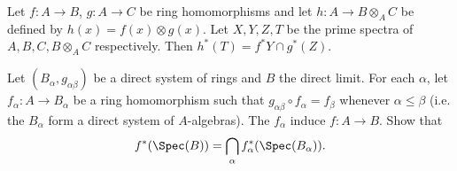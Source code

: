 \documentclass[a4paper]{exam}
\begin{document}
\begin{questions}
\question Let $f:A\to B $, $g:A\to C $ be ring homomorphisms and let $h: A \to B \otimes _A C $ be defined by $h(x) = f(x) \otimes g(x) $. Let $X,Y,Z,T $ be the prime spectra of $A,B,C,B \otimes _A C $ respectively. Then $h^\ast(T) = f^\ast Y \cap g^\ast(Z) $.

\question Let $(B_{\alpha }, g_{\alpha \beta}) $ be a direct system of rings and $B $ the direct limit. For each $\alpha $, let $f_{\alpha}: A\to B_{\alpha} $ be a ring homomorphism such that $g_{\alpha \beta} \circ f_{\alpha} = f_{\beta}$ whenever $\alpha\le \beta $ (i.e. the $B_{\alpha} $ form a direct system of $A $-algebras). The $f_{\alpha} $ induce $f:A\to B $. Show that
\[
	f^\ast(\Spec(B)) = \bigcap_{\alpha} f^\ast_ \alpha (\Spec(B_ \alpha))
.\] 
\end{questions}
\end{document}
